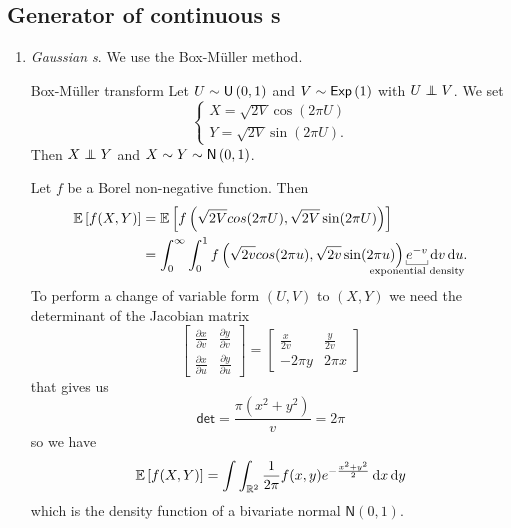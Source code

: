 \documentclass[12pt]{report}
\begin{document}
\subsection{Generator of continuous \rv s}
\begin{enumerate}[\circnum]
	\item \emph{Gaussian \rv s}. We use the Box-Müller method. \begin{algobox}{Box-Müller transform}
		Let $U\sim\mathsf{U}\left(0,1\right)$ and $V\sim\mathsf{Exp}\left(1\right)$ with $U\independent V$. We set
	\begin{equation*}
		\begin{cases}
			X=\sqrt{2V}\cos(2\pi U)\\
			Y=\sqrt{2V}\sin(2\pi U).
		\end{cases}
	\end{equation*}
	Then $X\independent Y$ and $X\sim Y\sim\mathsf{N}\left(0,1\right)$.
	\end{algobox}
	\begin{fancyproof}
		Let $f$ be a Borel non-negative function. Then
		\begin{align*}
			\ev{f(X,Y)}&=\ev{f\left(\sqrt{2V}cos(2\pi U),\sqrt{2V}\sin(2\pi U)\right)}\\
			&=\int_{0}^{\infty}\int_{0}^{1}f\left(\sqrt{2v}cos(2\pi u),\sqrt{2v}\sin(2\pi u)\right)\ubracketthin{e^{-v}}_{\claptext{exponential density}}\dif v\du.
		\end{align*}
		To perform a change of variable form $(U,V)$ to $(X,Y)$ we need the determinant of the Jacobian matrix
				\begin{equation*}
			\begin{bmatrix}
				\frac{\partial x}{\partial v}&\frac{\partial y}{\partial v}\\
				\frac{\partial x}{\partial u}&\frac{\partial y}{\partial u}
			\end{bmatrix}=\begin{bmatrix}
			\frac{x}{2v}&\frac{y}{2v}\\
			-2\pi y&2\pi x
			\end{bmatrix}
		\end{equation*}
		that gives us 
		\begin{equation*}
			\mathsf{det}=\frac{\pi(x^{2}+y^{2})}{v}=2\pi
		\end{equation*}
		so we have
		\begin{equation*}
				\mathbb{E}\left[f(X,Y)\right]=\int\int_{\mathbb{R}^{2}}\frac{1}{2\pi}f(x,y)e^{-\frac{x^{2}+y^{2}}{2}}\mathop{}\!\mathrm{d} x\mathop{}\!\mathrm{d} y
		\end{equation*}
		which is the density function of a bivariate normal $\mathsf{N}(0,1)$.

\end{fancyproof}
\end{enumerate}
\end{document}
